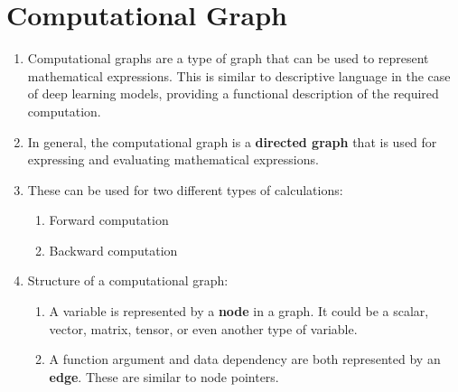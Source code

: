 







\section{Computational Graph}

\begin{enumerate}
    \item
    \begin{definition}
        Computational graphs are a type of graph that can be used to represent mathematical expressions.
        This is similar to descriptive language in the case of deep learning models, providing a functional description of the required computation.
        \hfill \cite{geeksforgeeks/deep-learning/computational-graphs-in-deep-learning}
    \end{definition}

    \item In general, the computational graph is a \textbf{directed graph} that is used for expressing and evaluating mathematical expressions.
    \hfill \cite{geeksforgeeks/deep-learning/computational-graphs-in-deep-learning}

    \item These can be used for two different types of calculations:
    \hfill \cite{geeksforgeeks/deep-learning/computational-graphs-in-deep-learning}
    \begin{enumerate}
        \item Forward computation
        \hfill \cite{geeksforgeeks/deep-learning/computational-graphs-in-deep-learning}

        \item Backward computation
        \hfill \cite{geeksforgeeks/deep-learning/computational-graphs-in-deep-learning}
    \end{enumerate}

    \item Structure of a computational graph:
    \begin{enumerate}
        \item A variable is represented by a \textbf{node} in a graph.
        It could be a scalar, vector, matrix, tensor, or even another type of variable.
        \hfill \cite{geeksforgeeks/deep-learning/computational-graphs-in-deep-learning}

        \item A function argument and data dependency are both represented by an \textbf{edge}.
        These are similar to node pointers.
        \hfill \cite{geeksforgeeks/deep-learning/computational-graphs-in-deep-learning}


\end{enumerate}
\end{enumerate}
